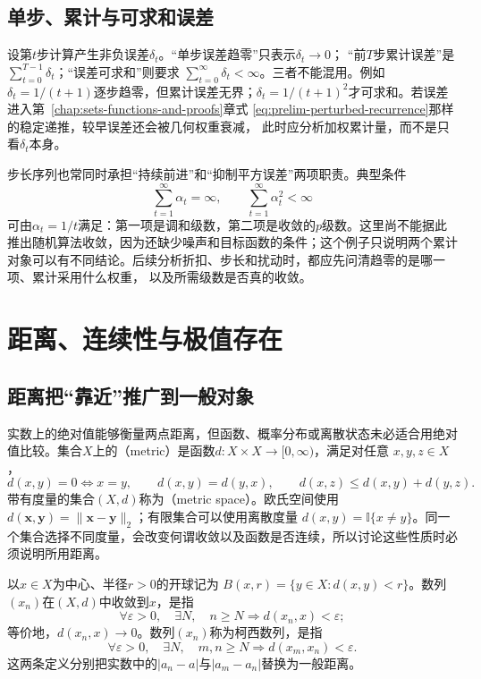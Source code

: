 \subsection{单步、累计与可求和误差}

设第$t$步计算产生非负误差$\delta_t$。“单步误差趋零”只表示$\delta_t\to0$； “前$T$步累计误差”是$\sum_{t=0}^{T-1}\delta_t$；“误差可求和”则要求 $\sum_{t=0}^{\infty}\delta_t<\infty$。三者不能混用。例如 $\delta_t=1/(t+1)$逐步趋零，但累计误差无界；$\delta_t=1/(t+1)^2$才可求和。若误差进入第~\ref{chap:sets-functions-and-proofs}章式
\eqref{eq:prelim-perturbed-recurrence}那样的稳定递推，较早误差还会被几何权重衰减， 此时应分析加权累计量，而不是只看$\delta_t$本身。

步长序列也常同时承担“持续前进”和“抑制平方误差”两项职责。典型条件
\[   \sum_{t=1}^{\infty}\alpha_t=\infty,   \qquad   \sum_{t=1}^{\infty}\alpha_t^2<\infty \]
可由$\alpha_t=1/t$满足：第一项是调和级数，第二项是收敛的$p$级数。这里尚不能据此推出随机算法收敛，因为还缺少噪声和目标函数的条件；这个例子只说明两个累计对象可以有不同结论。后续分析折扣、步长和扰动时，都应先问清趋零的是哪一项、累计采用什么权重， 以及所需级数是否真的收敛。
\section{距离、连续性与极值存在}
\label{sec:analysis-metric-continuity-extrema}
\subsection{距离把“靠近”推广到一般对象}

实数上的绝对值能够衡量两点距离，但函数、概率分布或离散状态未必适合用绝对值比较。集合$X$上的（metric）是函数$d:X\times X\to[0,\infty)$，满足对任意 $x,y,z\in X$，
\[   d(x,y)=0\Longleftrightarrow x=y,\qquad   d(x,y)=d(y,x),\qquad   d(x,z)\leq d(x,y)+d(y,z). \]
带有度量的集合$(X,d)$称为（metric space）。欧氏空间使用 $d(\bm{x},\bm{y})=\lVert\bm{x}-\bm{y}\rVert_2$；有限集合可以使用离散度量 $d(x,y)=\mathbb{I}\{x\neq y\}$。同一个集合选择不同度量，会改变何谓收敛以及函数是否连续，所以讨论这些性质时必须说明所用距离。

以$x\in X$为中心、半径$r>0$的开球记为
$B(x,r)=\{y\in X:d(x,y)<r\}$。数列$(x_n)$在$(X,d)$中收敛到$x$，是指
\[
  \forall\varepsilon>0,\quad
  \exists N,\quad
  n\geq N\Longrightarrow d(x_n,x)<\varepsilon;
\]
等价地，$d(x_n,x)\to0$。数列$(x_n)$称为柯西数列，是指
\[
  \forall\varepsilon>0,\quad
  \exists N,\quad
  m,n\geq N\Longrightarrow d(x_m,x_n)<\varepsilon.
\]
这两条定义分别把实数中的$|a_n-a|$与$|a_m-a_n|$替换为一般距离。

